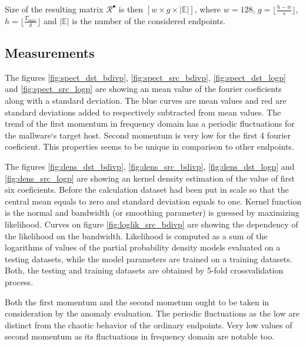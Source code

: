 \documentclass[a4paper]{IEEEtran}
\begin{document}
Size of the resulting matrix $\mathcal{R}^\bullet$ is then
$[w\times g\times \lvert\mathbb{E}\rvert]$, where $w=128$, $g=\lfloor\frac{h-w}{s} \rfloor$, 
$h = \lfloor\frac{T_{max}}{\delta}\rfloor$ and $\lvert\mathbb{E}\rvert $ is the number of the 
considered endpoints.

\subsection{Measurements}
The figures \ref{fig:spect_dst_bdivp},
\ref{fig:spect_src_bdivp}, \ref{fig:spect_dst_logp} and \ref{fig:spect_src_logp} are 
showing an mean value of the fourier coeficients along with a standard deviation.
The blue curves are mean values and red are standard deviations added to respectively 
subtracted from mean values. 
The trend of the first momentum in frequency domain has a periodic fluctuations
for the mallware`s target host. Second momentum is
very low for the first 4 fourier coeficient. This properties seems to be unique in 
comparison to other endpoints.


The figures \ref{fig:dens_dst_bdivp},
\ref{fig:dens_src_bdivp}, \ref{fig:dens_dst_logp} and \ref{fig:dens_src_logp} are 
showing an kernel density estimation of the value of first six coeficients.
Before the calculation dataset had been put in scale so that the central mean equals to zero
and standard deviation equals to one. Kernel function is the normal and bandwidth (or smoothing parameter)
is guessed by maximizing likelihood. Curves on figure \ref{fig:loglik_src_bdivp} are showing
the dependency of the likelihood on the bandwidth. Likelihood is computed as a sum of the
logarithms of values of the partial probability density models evaluated on a testing datasets, 
while the model parameters are trained on a training datasets. Both, the testing and 
training datasets are obtained by 5-fold crossvalidation process. %

Both the first momentum and the second mometum ought to be taken in consideration 
by the anomaly evaluation. The periodic fluctuations as the low are distinct from the
chaotic behavior of the ordinary endpoints. Very low values of second momentum 
as its fluctuations in frequency domain are notable too.
\end{document}
